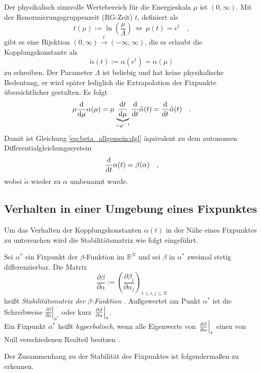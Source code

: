     Der physikalisch sinnvolle Wertebereich für die Energieskala $\mu$ ist 
    $(0,\infty)$. Mit der Renormierungsgruppenzeit (RG-Zeit) $t$, definiert als
    \begin{equation}
     t(\mu):=\ln\left(\frac{\mu}{\Lambda}\right) \,
     \Leftrightarrow \, \mu(t)=e^t \quad ,
    \end{equation}
    gibt es eine Bijektion $(0,\infty)\overset{t}{\longrightarrow}
    (-\infty,\infty)$, die es erlaubt die Kopplungskonstante als 
    \begin{equation}
    \tilde{\alpha}(t):=\alpha\left(e^t\right)=\alpha(\mu)
    \end{equation}
    zu schreiben. Der Parameter $\Lambda$ ist beliebig und hat keine 
    physikalische Bedeutung, er wird später lediglich die Extrapolation der 
    Fixpunkte übersichtlicher gestalten. Es folgt
    \begin{equation}
     \mu\frac{\text{d}}{\text{d}\mu}\alpha(\mu) = \mu \underbrace{\frac{\text{d} t}{\text{d} \mu}}_{=\mu^{-1}}
     \frac{\text{d}}{\text{d} t} \tilde{\alpha}(t)
     =\frac{\text{d}}{\text{d} t} \tilde{\alpha}(t) \quad .
    \end{equation}
    Damit ist Gleichung \eqref{eq:beta_allgemein:dgl} äquivalent zu dem 
    autonomen Differentialgleichungssystem 
    \begin{equation}
     \frac{\text{d}}{\text{d} t} \alpha(t)=\beta(\alpha) \quad , 
     \label{eq:beta_allgemein:dgl_alpha}
    \end{equation}
    wobei $\tilde{\alpha}$ wieder zu $\alpha$ umbenannt wurde.
    
  \subsection{Verhalten in einer Umgebung eines Fixpunktes}
    Um das Verhalten der Kopplungskonstanten $\alpha(t)$ in der Nähe eines 
    Fixpunktes zu untersuchen wird die Stabilitätsmatrix wie folgt eingeführt.
    \begin{definition}
    Sei $\alpha^*$ ein Fixpunkt der $\beta$-Funktion im $\mathbb{R}^N$ und 
    sei $\beta$ in 
    $\alpha^*$ zweimal stetig differenzierbar. Die Matrix
    \begin{equation}
     \frac{\partial \beta}{\partial \alpha}:= 
     \left( \frac{\partial \beta_i}{\partial \alpha_j} \right)_{1\leq i,j 
     \leq N}
    \end{equation}
    heißt \textit{Stabilitätsmatrix der $\beta$-Funktion} \cite{GR_Weinberg}. 
    Außgewertet am Punkt $\alpha^*$ 
    ist die Schreibweise $\left.\frac{\partial \beta}{\partial \alpha}
    \right|_{\alpha^*}$ oder kurz $\left.\frac{\partial \beta}{\partial \alpha}\right|_*$.\\
    Ein Fixpunkt $\alpha^*$ heißt \textit{hyperbolisch}, wenn alle Eigenwerte 
    von $\left.\frac{\partial \beta}{\partial \alpha}\right|_*$ einen von Null verschiedenen Realteil besitzen 
    \cite{Bronstein4}.
    \end{definition}
    Der Zusammenhang zu der Stabilität des Fixpunktes ist folgendermaßen zu 
    erkennen. 
    
